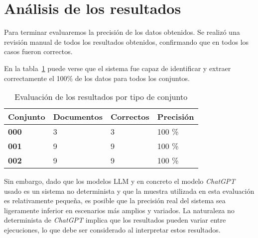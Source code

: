 \section{Análisis de los resultados}

Para terminar evaluaremos la precisión de los datos obtenidos.
Se realizó una revisión manual de todos los resultados obtenidos, confirmando que en todos los casos fueron
correctos.

En la tabla~\ref{tab:data_set_performance} puede verse que el sistema fue capaz de identificar y extraer
correctamente el 100\% de los datos para todos los conjuntos.

\begin{table}[h]
    \renewcommand{\arraystretch}{1.5}
    \setlength{\tabcolsep}{10pt}
    \begin{tabular}{>{\bfseries}p{} p{} p{} p{}}
        \toprule
        \textbf{Conjunto} & \textbf{Documentos} & \textbf{Correctos} & \textbf{Precisión} \\
        \midrule
        \textbf{000}      & 3                   & 3                  & 100 \%             \\
        \textbf{001}      & 9                   & 9                  & 100 \%             \\
        \textbf{002}      & 9                   & 9                  & 100 \%             \\
        \bottomrule
    \end{tabular}
    \caption{Evaluación de los resultados por tipo de conjunto}
    \label{tab:data_set_performance}
\end{table}

Sin embargo, dado que los modelos LLM y en concreto el modelo \textit{ChatGPT} usado es un sistema no determinista y
que la muestra utilizada en esta evaluación es relativamente pequeña, es posible que la precisión real del sistema sea
ligeramente inferior en escenarios más amplios y variados.
La naturaleza no determinista de \textit{ChatGPT}
implica que los resultados pueden variar entre ejecuciones, lo que debe ser considerado al interpretar estos resultados.
